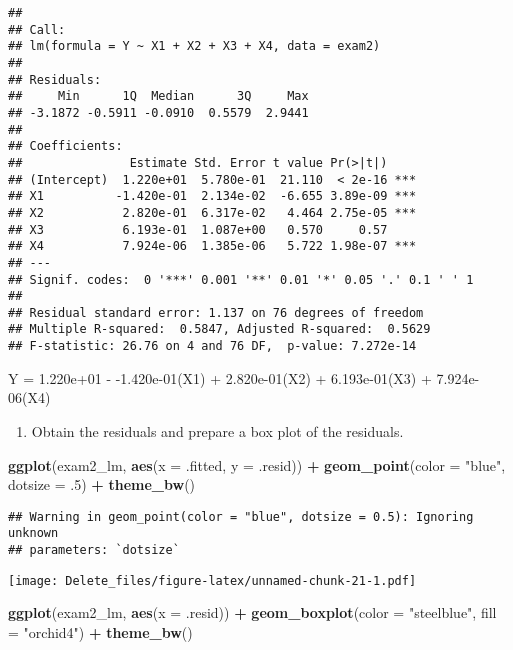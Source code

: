\documentclass[
]{article}
\newenvironment{Shaded}{\begin{snugshade}}{\end{snugshade}}
\newcommand{\AttributeTok}[1]{\textcolor[rgb]{0.13,0.29,0.53}{#1}}
\newcommand{\DecValTok}[1]{\textcolor[rgb]{0.00,0.00,0.81}{#1}}
\newcommand{\FunctionTok}[1]{\textcolor[rgb]{0.13,0.29,0.53}{\textbf{#1}}}
\newcommand{\NormalTok}[1]{#1}
\newcommand{\SpecialCharTok}[1]{\textcolor[rgb]{0.81,0.36,0.00}{\textbf{#1}}}
\newcommand{\StringTok}[1]{\textcolor[rgb]{0.31,0.60,0.02}{#1}}
\providecommand{\tightlist}{%
  \setlength{\itemsep}{0pt}\setlength{\parskip}{0pt}}
\begin{document}
\begin{verbatim}
## 
## Call:
## lm(formula = Y ~ X1 + X2 + X3 + X4, data = exam2)
## 
## Residuals:
##     Min      1Q  Median      3Q     Max 
## -3.1872 -0.5911 -0.0910  0.5579  2.9441 
## 
## Coefficients:
##               Estimate Std. Error t value Pr(>|t|)    
## (Intercept)  1.220e+01  5.780e-01  21.110  < 2e-16 ***
## X1          -1.420e-01  2.134e-02  -6.655 3.89e-09 ***
## X2           2.820e-01  6.317e-02   4.464 2.75e-05 ***
## X3           6.193e-01  1.087e+00   0.570     0.57    
## X4           7.924e-06  1.385e-06   5.722 1.98e-07 ***
## ---
## Signif. codes:  0 '***' 0.001 '**' 0.01 '*' 0.05 '.' 0.1 ' ' 1
## 
## Residual standard error: 1.137 on 76 degrees of freedom
## Multiple R-squared:  0.5847, Adjusted R-squared:  0.5629 
## F-statistic: 26.76 on 4 and 76 DF,  p-value: 7.272e-14
\end{verbatim}

Y = 1.220e+01 - -1.420e-01(X1) + 2.820e-01(X2) + 6.193e-01(X3) +
7.924e-06(X4)

\begin{enumerate}
\def\labelenumi{(\alph{enumi})}
\setcounter{enumi}{5}
\tightlist
\item
  Obtain the residuals and prepare a box plot of the residuals.
\end{enumerate}

\begin{Shaded}
\begin{Highlighting}[]
\FunctionTok{ggplot}\NormalTok{(exam2\_lm, }\FunctionTok{aes}\NormalTok{(}\AttributeTok{x =}\NormalTok{ .fitted, }\AttributeTok{y =}\NormalTok{ .resid)) }\SpecialCharTok{+} \FunctionTok{geom\_point}\NormalTok{(}\AttributeTok{color =} \StringTok{"blue"}\NormalTok{, }\AttributeTok{dotsize =}\NormalTok{ .}\DecValTok{5}\NormalTok{) }\SpecialCharTok{+} \FunctionTok{theme\_bw}\NormalTok{()}
\end{Highlighting}
\end{Shaded}

\begin{verbatim}
## Warning in geom_point(color = "blue", dotsize = 0.5): Ignoring unknown
## parameters: `dotsize`
\end{verbatim}

\texttt{[image: Delete\_files/figure-latex/unnamed-chunk-21-1.pdf]}

\begin{Shaded}
\begin{Highlighting}[]
\FunctionTok{ggplot}\NormalTok{(exam2\_lm, }\FunctionTok{aes}\NormalTok{(}\AttributeTok{x =}\NormalTok{ .resid)) }\SpecialCharTok{+} \FunctionTok{geom\_boxplot}\NormalTok{(}\AttributeTok{color =} \StringTok{"steelblue"}\NormalTok{, }\AttributeTok{fill =} \StringTok{"orchid4"}\NormalTok{) }\SpecialCharTok{+} \FunctionTok{theme\_bw}\NormalTok{()}
\end{Highlighting}
\end{Shaded}
\end{document}
